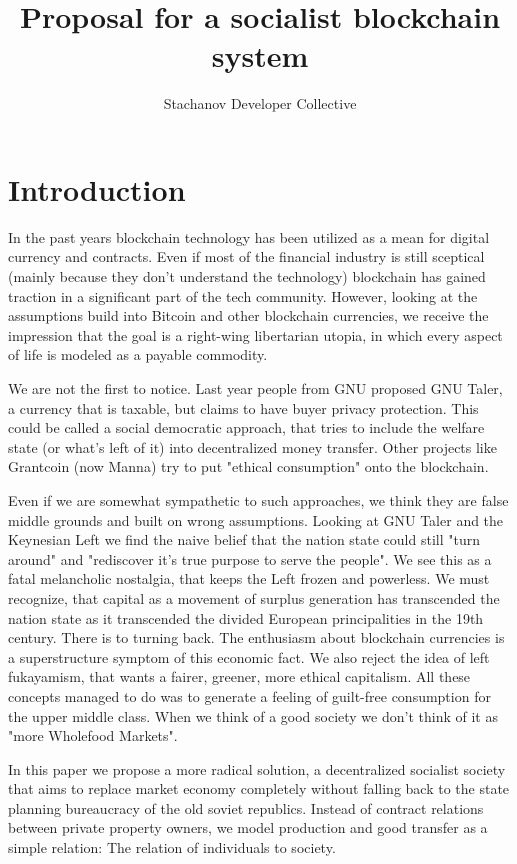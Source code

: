 \documentclass[11pt]{article}
\title{\textbf{Proposal for a socialist blockchain system}}
\author{Stachanov Developer Collective}
\date{}
\begin{document}
\maketitle
\tableofcontents

\section{Introduction}

In the past years blockchain technology has been utilized as a mean for digital currency and contracts. Even if most of the financial industry is still sceptical (mainly because they don't understand the technology) blockchain has gained traction in a significant part of the tech community. However, looking at the assumptions build into Bitcoin and other blockchain currencies, we receive the impression that the goal is a right-wing libertarian utopia, in which every aspect of life is modeled as a payable commodity.

We are not the first to notice. Last year people from GNU proposed GNU Taler, a currency that is taxable, but claims to have buyer privacy protection. This could be called a social democratic approach, that tries to include the welfare state (or what's left of it) into decentralized money transfer. Other projects like Grantcoin (now Manna) try to put "ethical consumption" onto the blockchain. 

Even if we are somewhat sympathetic to such approaches, we think they are false middle grounds and built on wrong assumptions. Looking at GNU Taler and the Keynesian Left we find the naive belief that the nation state could still "turn around" and "rediscover it's true purpose to serve the people". We see this as a fatal melancholic nostalgia, that keeps the Left frozen and powerless. We must recognize, that capital as a movement of surplus generation has transcended the nation state as it transcended the divided European principalities in the 19th century. There is to turning back. The enthusiasm about blockchain currencies is a superstructure symptom of this economic fact. We also reject the idea of left fukayamism, that wants a fairer, greener, more ethical capitalism. All these concepts managed to do was to generate a feeling of guilt-free consumption for the upper middle class. When we think of a good society we don't think of it as "more Wholefood Markets".

In this paper we propose a more radical solution, a decentralized socialist society that aims to replace market economy completely without falling back to the state planning bureaucracy of the old soviet republics. Instead of contract relations between private property owners, we model production and good transfer as a simple relation: The relation of individuals to society.
\end{document}

